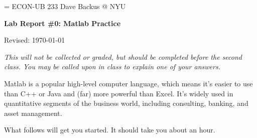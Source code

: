 \documentclass[11pt]{exam}
\begin{document}
\parskip=\bigskipamount
\parindent=0.0in
\thispagestyle{empty}
{\large ECON-UB 233 \hfill Dave Backus @ NYU}

\bigskip\bigskip
\centerline{\Large \bf Lab Report \#0:  Matlab Practice}
\centerline{Revised: \today}

\bigskip
{\it This will not be collected or graded,
but should be completed before the second class.
You may be called upon in class to explain one of your answers.}

Matlab is a popular high-level computer language,
which means it's easier to use than C++ or Java
and (far) more powerful than Excel.
It's widely used in quantitative segments of the business world,
including consulting, banking, and asset management.

What follows will get you started.  It should take you about an hour.
\end{document}
